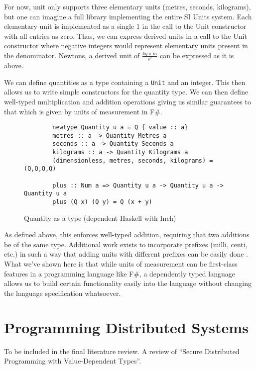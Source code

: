 For now, unit only supports three elementary units (metres, seconds, kilograms),
but one can imagine a full library implementing the entire SI Units system. Each
elementary unit is implemented as a single 1 in the call to the Unit constructor
with all entries as zero. Thus, we can express derived units in a call to the
Unit constructor where negative integers would represent elementary units
present in the denominator. Newtons, a derived unit of $\frac{kg \times m}{s^2}$ can be expressed as it is above. 

We can define quantities as a type containing a \texttt{Unit} and an integer. This then allows us to write simple constructors for the quantity type. We can
 then define well-typed multiplication and addition operations
giving us similar guarantees to that which is given by units of measurement in
F\#. 

\begin{figure}[h]
    \caption{Quantity as a type (dependent Haskell with Inch) \cite{gundry2013}}
    \begin{lstlisting}
        newtype Quantity u a = Q { value :: a}
        metres :: a -> Quantity Metres a
        seconds :: a -> Quantity Seconds a
        kilograms :: a -> Quantity Kilograms a
        (dimensionless, metres, seconds, kilograms) = (Q,Q,Q,Q)

        plus :: Num a => Quantity u a -> Quantity u a -> Quantity u a
        plus (Q x) (Q y) = Q (x + y)
    \end{lstlisting}
\end{figure}

As defined above, this enforces well-typed addition, requiring that two
additions be of the same type. Additional work exists to incorporate prefixes
(milli, centi, etc.) in such a way that adding units with different prefixes can
be easily done \cite{gundry2013}. What we've shown here is that while units of
measurement can be first-class features in a programming language like F\#, a
dependently typed language allows us to build certain functionality easily into
the language without changing the language specification whatsoever. 

\section{Programming Distributed Systems}

To be included in the final literature review. A review of ``Secure Distributed
Programming with Value-Dependent Types''. \cite{fstar_distributed_programming}

